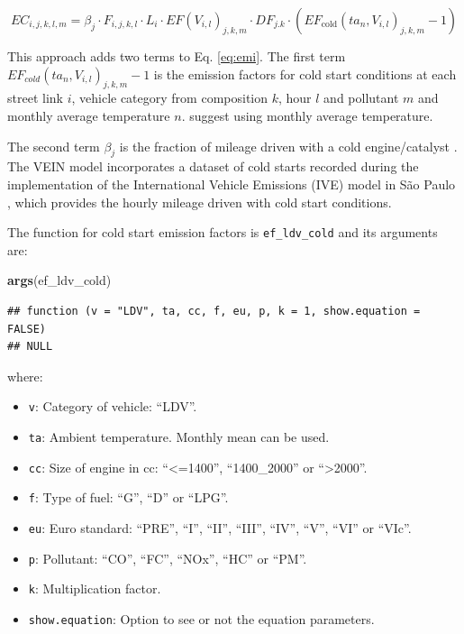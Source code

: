 \documentclass[12pt,graybox,envcountchap,sectrefs]{krantz}
\makeatletter
\newenvironment{Shaded}{\begin{snugshade}}{\end{snugshade}}
\newcommand{\KeywordTok}[1]{\textcolor[rgb]{0.13,0.29,0.53}{\textbf{#1}}}
\newcommand{\NormalTok}[1]{#1}
\providecommand{\tightlist}{%
  \setlength{\itemsep}{0pt}\setlength{\parskip}{0pt}}
\newenvironment{kframe}{%
\medskip{}
\setlength{\fboxsep}{.8em}
 \def\at@end@of@kframe{}%
 \ifinner\ifhmode%
  \def\at@end@of@kframe{\end{minipage}}%
  \begin{minipage}{\columnwidth}%
 \fi\fi%
 \def\FrameCommand##1{\hskip\@totalleftmargin \hskip-\fboxsep
 \colorbox{shadecolor}{##1}\hskip-\fboxsep
     \hskip-\linewidth \hskip-\@totalleftmargin \hskip\columnwidth}%
 \MakeFramed {\advance\hsize-\width
   \@totalleftmargin\z@ \linewidth\hsize
   \@setminipage}}%
 {\par\unskip\endMakeFramed%
 \at@end@of@kframe}
\renewenvironment{Shaded}{\begin{kframe}}{\end{kframe}}
\theoremstyle{definition}
\theoremstyle{definition}
\theoremstyle{definition}
\theoremstyle{remark}
\makeatother
\begin{document}
\begin{equation}
EC_{i,j,k,l,m} =\beta_{j} \cdot F_{i,j,k,l} \cdot L_i \cdot EF(V_{i,l})_{j,k,m} \cdot DF_{j.k} \cdot \left(EF_{\mbox{cold}}(ta_n,V_{i,l})_{j,k,m}-1\right)
\label{eq:cold}
\end{equation}

This approach adds two terms to Eq. \ref{eq:emi}. The first term
\(EF_{cold}(ta_n,V_{i,l})_{j,k,m}-1\) is the emission factors for cold
start conditions at each street link \(i\), vehicle category from
composition \(k\), hour \(l\) and pollutant \(m\) and monthly average
temperature \(n\). \citep{NtziachristosSamaras2016} suggest using
monthly average temperature.

The second term \(\beta_j\) is the fraction of mileage driven with a
cold engine/catalyst \citep{NtziachristosSamaras2016}. The VEIN model
incorporates a dataset of cold starts recorded during the implementation
of the International Vehicle Emissions (IVE) model \citep{Davisetal2005}
in São Paulo \citep{ivesp}, which provides the hourly mileage driven
with cold start conditions.

The function for cold start emission factors is \texttt{ef\_ldv\_cold}
and its arguments are:

\begin{Shaded}
\begin{Highlighting}[]
\KeywordTok{args}\NormalTok{(ef_ldv_cold)}
\end{Highlighting}
\end{Shaded}

\begin{verbatim}
## function (v = "LDV", ta, cc, f, eu, p, k = 1, show.equation = FALSE) 
## NULL
\end{verbatim}

where:

\begin{itemize}
\tightlist
\item
  \texttt{v}: Category of vehicle: ``LDV''.
\item
  \texttt{ta}: Ambient temperature. Monthly mean can be used.
\item
  \texttt{cc}: Size of engine in cc: ``\textless{}=1400'',
  ``1400\_2000'' or ``\textgreater{}2000''.
\item
  \texttt{f}: Type of fuel: ``G'', ``D'' or ``LPG''.
\item
  \texttt{eu}: Euro standard: ``PRE'', ``I'', ``II'', ``III'', ``IV'',
  ``V'', ``VI'' or ``VIc''.
\item
  \texttt{p}: Pollutant: ``CO'', ``FC'', ``NOx'', ``HC'' or ``PM''.
\item
  \texttt{k}: Multiplication factor.
\item
  \texttt{show.equation}: Option to see or not the equation parameters.
\end{itemize}
\end{document}
